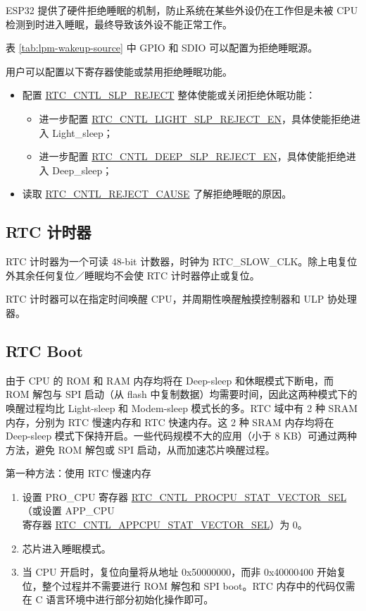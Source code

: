 \documentclass[main\_\_CN.tex]{subfiles}
\begin{document}
ESP32 提供了硬件拒绝睡眠的机制，防止系统在某些外设仍在工作但是未被 CPU 检测到时进入睡眠，最终导致该外设不能正常工作。

表 \ref{tab:lpm-wakeup-source} 中 GPIO 和 SDIO 可以配置为拒绝睡眠源。

用户可以配置以下寄存器使能或禁用拒绝睡眠功能。
\begin{itemize}
    \item 配置 \hyperref[regdesc:RTCCNTLSTATE0REG]{RTC\_CNTL\_SLP\_REJECT} 整体使能或关闭拒绝休眠功能：
        \begin{itemize}
            \item 进一步配置 \hyperref[regdesc:RTCCNTLSLPREJECTCONFREG]{RTC\_CNTL\_LIGHT\_SLP\_REJECT\_EN}，具体使能拒绝进入 Light\_sleep；
            \item 进一步配置 \hyperref[regdesc:RTCCNTLSLPREJECTCONFREG]{RTC\_CNTL\_DEEP\_SLP\_REJECT\_EN}，具体使能拒绝进入 Deep\_sleep；
        \end{itemize}
    \item 读取 \hyperref[regdesc:RTCCNTLSLPREJECTCONFREG]{RTC\_CNTL\_REJECT\_CAUSE} 了解拒绝睡眠的原因。
\end{itemize}

\subsection{RTC 计时器}
RTC 计时器为一个可读 48-bit 计数器，时钟为 RTC\_SLOW\_CLK。除上电复位外其余任何复位／睡眠均不会使 RTC 计时器停止或复位。

RTC 计时器可以在指定时间唤醒 CPU，并周期性唤醒触摸控制器和 ULP 协处理器。

\subsection{RTC Boot}

由于 CPU 的 ROM 和 RAM 内存均将在 Deep-sleep 和休眠模式下断电，而 ROM 解包与 SPI 启动（从 flash 中复制数据）均需要时间，因此这两种模式下的唤醒过程均比 Light-sleep 和 Modem-sleep 模式长的多。RTC 域中有 2 种 SRAM 内存，分别为 RTC 慢速内存和 RTC 快速内存。这 2 种 SRAM 内存均将在 Deep-sleep 模式下保持开启。一些代码规模不大的应用（小于 8 KB）可通过两种方法，避免 ROM 解包或 SPI 启动，从而加速芯片唤醒过程。

第一种方法：使用 RTC 慢速内存

\begin{enumerate}
    \item  设置 PRO\_CPU 寄存器 \hyperref[regdesc:RTCCNTLRESETSTATEREG]{RTC\_CNTL\_PROCPU\_STAT\_VECTOR\_SEL}（或设置 APP\_CPU \\寄存器 \hyperref[regdesc:RTCCNTLRESETSTATEREG]{RTC\_CNTL\_APPCPU\_STAT\_VECTOR\_SEL}）为 0。
    \item 芯片进入睡眠模式。
    \item 当 CPU 开启时，复位向量将从地址 0x50000000，而非 0x40000400 开始复位，整个过程并不需要进行 ROM 解包和 SPI boot。RTC 内存中的代码仅需在 C 语言环境中进行部分初始化操作即可。
\end{enumerate}
\end{document}

